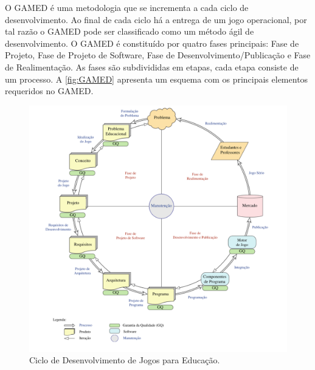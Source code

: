 
O GAMED é uma metodologia que se incrementa a cada ciclo de desenvolvimento. Ao final de cada ciclo há a entrega de um jogo operacional, por tal razão o GAMED pode ser classificado como um método ágil de desenvolvimento. O GAMED é constituído por quatro fases principais: Fase de Projeto, Fase de Projeto de Software, Fase de Desenvolvimento/Publicação e Fase de Realimentação. As fases são subdivididas em etapas, cada etapa consiste de um processo. A \autoref{fig:GAMED} apresenta um esquema com os principais elementos requeridos no GAMED. 

\pagebreak

\begin{figure}[htb]

	\caption{\label{fig:GAMED}Ciclo de Desenvolvimento de Jogos para Educação.}
  \begin{center}%
    \includegraphics[width=1.05\linewidth]{./Figuras/GAMED.pdf}
	\end{center}%

\end{figure}

